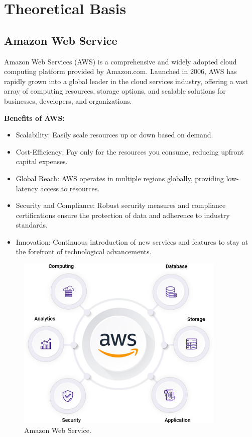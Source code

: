 \documentclass{article}
\begin{document}
\newpage

\section{Theoretical Basis}
\subsection{Amazon Web Service}
Amazon Web Services (AWS) is a comprehensive and widely adopted cloud computing platform provided by Amazon.com. Launched in 2006, AWS has rapidly grown into a global leader in the cloud services industry, offering a vast array of computing resources, storage options, and scalable solutions for businesses, developers, and organizations.\par
\vspace{10pt}
\textbf{Benefits of AWS:}\par
\begin{itemize}
    \item Scalability: Easily scale resources up or down based on demand.
    \item Cost-Efficiency: Pay only for the resources you consume, reducing upfront capital expenses.
    \item Global Reach: AWS operates in multiple regions globally, providing low-latency access to resources.
    \item Security and Compliance: Robust security measures and compliance certifications ensure the protection of data and adherence to industry standards.
    \item Innovation: Continuous introduction of new services and features to stay at the forefront of technological advancements.
\end{itemize}

\begin{figure}[h]
    \centering
    \includegraphics[width = 10cm]{Pictures/Theory/AWS.png}
    \caption{Amazon Web Service.}
    \label{fig:enter-label}
\end{figure}
\end{document}
